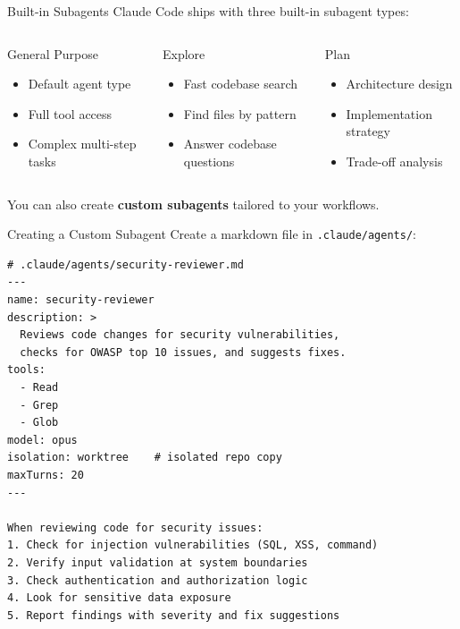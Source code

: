 \documentclass[aspectratio=169]{beamer}
\begin{document}
\begin{frame}{Built-in Subagents}
Claude Code ships with three built-in subagent types:

\bigskip
\begin{columns}[T]
\begin{block}{General Purpose}
\begin{itemize}
  \item Default agent type
  \item Full tool access
  \item Complex multi-step tasks
\end{itemize}
\end{block}

\begin{block}{Explore}
\begin{itemize}
  \item Fast codebase search
  \item Find files by pattern
  \item Answer codebase questions
\end{itemize}
\end{block}

\begin{block}{Plan}
\begin{itemize}
  \item Architecture design
  \item Implementation strategy
  \item Trade-off analysis
\end{itemize}
\end{block}
\end{columns}

\bigskip
You can also create \textbf{custom subagents} tailored to your workflows.
\end{frame}

\begin{frame}[fragile]{Creating a Custom Subagent}
Create a markdown file in \texttt{.claude/agents/}:

\begin{lstlisting}[]
# .claude/agents/security-reviewer.md
---
name: security-reviewer
description: >
  Reviews code changes for security vulnerabilities,
  checks for OWASP top 10 issues, and suggests fixes.
tools:
  - Read
  - Grep
  - Glob
model: opus
isolation: worktree    # isolated repo copy
maxTurns: 20
---

When reviewing code for security issues:
1. Check for injection vulnerabilities (SQL, XSS, command)
2. Verify input validation at system boundaries
3. Check authentication and authorization logic
4. Look for sensitive data exposure
5. Report findings with severity and fix suggestions
\end{lstlisting}
\end{frame}
\end{document}
